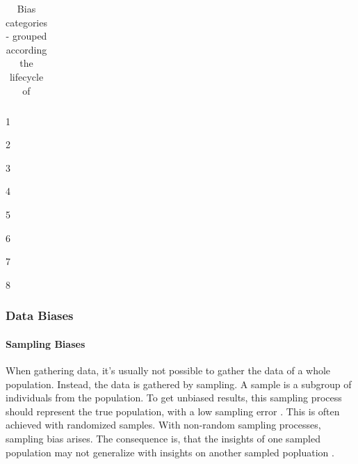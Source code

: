 \begin{refsection}
\begin{table}[H]
\begin{threeparttable}
\begin{tabularx}{\textwidth}{>{\tblWidthDescription}X|>{\tblWidthContext}X|>{\tblWidthContext}X}
					\bottomrule
				\end{tabularx}
				\begin{tablenotes}
					\footnotesize
					\begin{minipage}{0.33\textwidth}\raggedright
						\item[1] \autocite{Mehrabi_2021}
						\item[2] \autocite{HP_2022}
						\item[3] \autocites{Mester_2022}
					\end{minipage}%
					\begin{minipage}{0.33\textwidth}\raggedright
						\item[4] \autocite{Chakraborty_2024}
						\item[5] \autocite{Young_2020}
						\item[6] \autocite{Montoya_2025}
					\end{minipage}%
					\begin{minipage}{0.33\textwidth}\raggedright
						\item[7] \autocites{Mester_2017}
						\item[8] \autocite{Delgado-Rodriguez_2004}
					\end{minipage}%
				\end{tablenotes}
			\end{threeparttable}
			\caption{Bias categories - grouped according the  lifecycle of \textcite{Mehrabi_2021}}
			\label{tab:biases_types}
		\end{table}
		
		\subsubsection{Data Biases}
		
		\paragraph{Sampling Biases}
		When gathering data, it's usually not possible to gather the data of a whole population. Instead, the data is gathered by sampling. A sample is a subgroup of individuals from the population. To get unbiased results, this sampling process should represent the true population, with a low sampling error \autocites{HP_2022}. This is often achieved with randomized samples. With non-random sampling processes, sampling bias arises. The consequence is, that the insights of one sampled population may not generalize with insights on another sampled popluation \autocite{Mehrabi_2021}.
		

\end{refsection}
